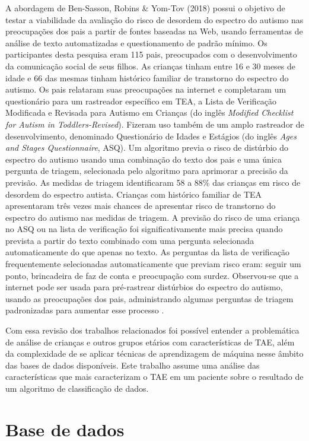 \documentclass{template/sig-alternate-05-2015}
\begin{document}
A abordagem de Ben-Sasson, Robins \& Yom-Tov (2018) possui o objetivo
de testar a viabilidade da avaliação do risco de desordem do espectro
do autismo nas preocupações dos pais a partir de fontes baseadas na
Web, usando ferramentas de análise de texto automatizadas e
questionamento de padrão mínimo. Os participantes desta pesquisa eram
115 pais, preocupados com o desenvolvimento da comunicação social de
seus filhos. As crianças tinham entre 16 e 30 meses de idade e 66 das
mesmas tinham histórico familiar de transtorno do espectro do
autismo. Os pais relataram suas preocupações na internet e completaram
um questionário para um rastreador específico em TEA, a Lista de
Verificação Modificada e Revisada para Autismo em Crianças (do inglês
\textit{Modified Checklist for Autism in Toddlers-Revised}). Fizeram
uso também de um amplo rastreador de desenvolvimento, denominado
Questionário de Idades e Estágios (do inglês \textit{Ages and Stages
  Questionnaire}, ASQ). Um algoritmo previa o risco de distúrbio do
espectro do autismo usando uma combinação do texto dos pais e uma
única pergunta de triagem, selecionada pelo algoritmo para aprimorar a
precisão da previsão. As medidas de triagem identificaram 58 a 88\%
das crianças em risco de desordem do espectro autista. Crianças com
histórico familiar de TEA apresentaram três vezes mais chances de
apresentar risco de transtorno do espectro do autismo nas medidas de
triagem. A previsão do risco de uma criança no ASQ ou na lista de
verificação foi significativamente mais precisa quando prevista a
partir do texto combinado com uma pergunta selecionada automaticamente
do que apenas no texto. As perguntas da lista de verificação
frequentemente selecionadas automaticamente que previam risco eram:
seguir um ponto, brincadeira de faz de conta e preocupação com
surdez. Observou-se que a internet pode ser usada para pré-rastrear
distúrbios do espectro do autismo, usando as preocupações dos pais,
administrando algumas perguntas de triagem padronizadas para aumentar
esse processo \cite{Sasson:2018}.

Com essa revisão dos trabalhos relacionados foi possível entender a
problemática de análise de crianças e outros grupos etários com
características de TAE, além da complexidade de se aplicar técnicas de
aprendizagem de máquina nesse âmbito das bases de dados
disponíveis. Este trabalho assume uma análise das características que
mais caracterizam o TAE em um paciente sobre o resultado de um
algoritmo de classificação de dados.

\section{Base de dados}
\end{document}
